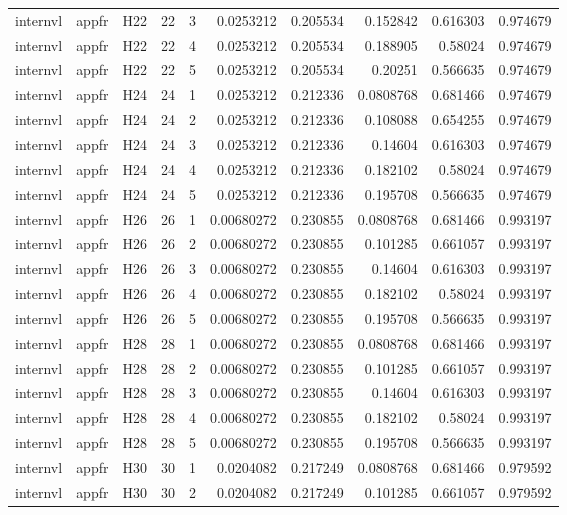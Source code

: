 \begin{longtable}{lllrrrrrrr}
internvl & appfr & H22 & 22 & 3 & 0.0253212 & 0.205534 & 0.152842 & 0.616303 & 0.974679 \\
internvl & appfr & H22 & 22 & 4 & 0.0253212 & 0.205534 & 0.188905 & 0.58024 & 0.974679 \\
internvl & appfr & H22 & 22 & 5 & 0.0253212 & 0.205534 & 0.20251 & 0.566635 & 0.974679 \\
internvl & appfr & H24 & 24 & 1 & 0.0253212 & 0.212336 & 0.0808768 & 0.681466 & 0.974679 \\
internvl & appfr & H24 & 24 & 2 & 0.0253212 & 0.212336 & 0.108088 & 0.654255 & 0.974679 \\
internvl & appfr & H24 & 24 & 3 & 0.0253212 & 0.212336 & 0.14604 & 0.616303 & 0.974679 \\
internvl & appfr & H24 & 24 & 4 & 0.0253212 & 0.212336 & 0.182102 & 0.58024 & 0.974679 \\
internvl & appfr & H24 & 24 & 5 & 0.0253212 & 0.212336 & 0.195708 & 0.566635 & 0.974679 \\
internvl & appfr & H26 & 26 & 1 & 0.00680272 & 0.230855 & 0.0808768 & 0.681466 & 0.993197 \\
internvl & appfr & H26 & 26 & 2 & 0.00680272 & 0.230855 & 0.101285 & 0.661057 & 0.993197 \\
internvl & appfr & H26 & 26 & 3 & 0.00680272 & 0.230855 & 0.14604 & 0.616303 & 0.993197 \\
internvl & appfr & H26 & 26 & 4 & 0.00680272 & 0.230855 & 0.182102 & 0.58024 & 0.993197 \\
internvl & appfr & H26 & 26 & 5 & 0.00680272 & 0.230855 & 0.195708 & 0.566635 & 0.993197 \\
internvl & appfr & H28 & 28 & 1 & 0.00680272 & 0.230855 & 0.0808768 & 0.681466 & 0.993197 \\
internvl & appfr & H28 & 28 & 2 & 0.00680272 & 0.230855 & 0.101285 & 0.661057 & 0.993197 \\
internvl & appfr & H28 & 28 & 3 & 0.00680272 & 0.230855 & 0.14604 & 0.616303 & 0.993197 \\
internvl & appfr & H28 & 28 & 4 & 0.00680272 & 0.230855 & 0.182102 & 0.58024 & 0.993197 \\
internvl & appfr & H28 & 28 & 5 & 0.00680272 & 0.230855 & 0.195708 & 0.566635 & 0.993197 \\
internvl & appfr & H30 & 30 & 1 & 0.0204082 & 0.217249 & 0.0808768 & 0.681466 & 0.979592 \\
internvl & appfr & H30 & 30 & 2 & 0.0204082 & 0.217249 & 0.101285 & 0.661057 & 0.979592 \\

\end{longtable}
